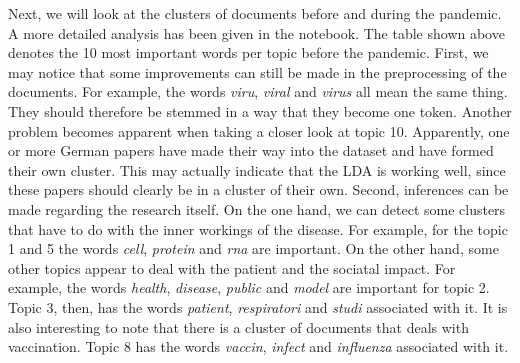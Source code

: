 \documentclass[10pt, a4paper, twocolumn]{article} %
\begin{document}
Next, we will look at the clusters of documents before and during the pandemic. A more detailed analysis has been given in the notebook. The table shown above denotes the 10 most important words per topic before the pandemic. 
First, we may notice that some improvements can still be made in the preprocessing of the documents. For example, the words \textit{viru}, \textit{viral} and \textit{virus} all mean the same thing. They should therefore be stemmed in a way that they become one token. Another problem becomes apparent when taking a closer look at topic 10. Apparently, one or more German papers have made their way into the dataset and have formed their own cluster. This may actually indicate that the LDA is working well, since these papers should clearly be in a cluster of their own.
Second, inferences can be made regarding the research itself. On the one hand, we can detect some clusters that have to do with the inner workings of the disease. For example, for the topic 1 and 5 the words \textit{cell}, \textit{protein} and \textit{rna} are important. On the other hand, some other topics appear to deal with the patient and the sociatal impact. For example, the words \textit{health}, \textit{disease}, \textit{public} and \textit{model} are important for topic 2. Topic 3, then, has the words \textit{patient}, \textit{respiratori} and \textit{studi} associated with it. It is also interesting to note that there is a cluster of documents that deals with vaccination. Topic 8 has the words \textit{vaccin}, \textit{infect} and \textit{influenza} associated with it.
\end{document}
